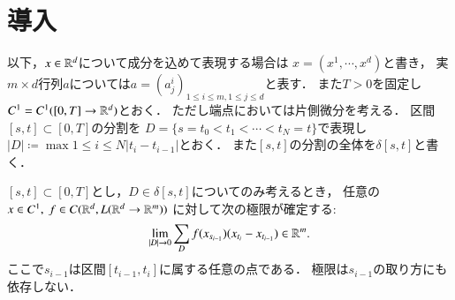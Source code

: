 \section{導入}
	以下，$x \in \mathbb{R}^d$について成分を込めて表現する場合は
	$x = (x^1,\cdots,x^d)$と書き，
	実$m \times d$行列$a$については$a=(a^i_j)_{1 \leq i \leq m,1 \leq j \leq d}$と表す．
	また$T > 0$を固定し$C^1 = C^1([0,T] \rightarrow \mathbb{R}^d)$とおく．
	ただし端点においては片側微分を考える．
	区間$[s,t] \subset [0,T]$の分割を
	$D = \{s = t_0 < t_1 < \cdots < t_N = t\}$で表現し
	$|D| \coloneqq \max{1 \leq i \leq N}{\left| t_i - t_{i-1} \right|}$とおく．
	また$[s,t]$の分割の全体を$\delta[s,t]$と書く．

	\begin{screen}
		\begin{thm}\label{thm:existence_of_Riemann_Stieltjes_integral}
			$[s,t] \subset [0,T]$とし，$D \in \delta[s,t]$についてのみ考えるとき，
			任意の$x \in C^1,\ f \in C(\mathbb{R}^d,L(\mathbb{R}^d \rightarrow \mathbb{R}^m))$
			に対して次の極限が確定する:\footnotemark
			\begin{align}
				\lim_{|D| \to 0}
				\sum_{D} f(x_{s_{i-1}})(x_{t_i} - x_{t_{i-1}})
				\in \mathbb{R}^m.
			\end{align}
			ここで$s_{i-1}$は区間$[t_{i-1},t_i]$に属する任意の点である．
			極限は$s_{i-1}$の取り方にも依存しない．
		\end{thm}
	\end{screen}
